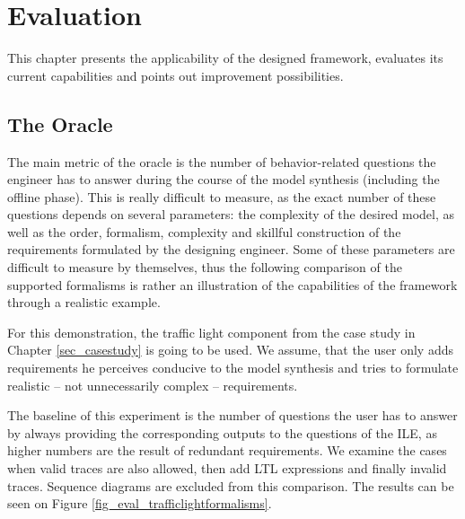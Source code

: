 \chapter{Evaluation}
This chapter presents the applicability of the designed framework, evaluates its current capabilities and points out improvement possibilities.

\section{The Oracle} \label{subs_evaloracle}
The main metric of the oracle is the number of behavior-related questions the engineer has to answer during the course of the model synthesis (including the offline phase). This is really difficult to measure, as the exact number of these questions depends on several parameters: the complexity of the desired model, as well as the order, formalism, complexity and skillful construction of the requirements formulated by the designing engineer. Some of these parameters are difficult to measure by themselves, thus the following comparison of the supported formalisms is rather an illustration of the capabilities of the framework through a realistic example. 

For this demonstration, the traffic light component from the case study in Chapter \ref{sec_casestudy} is going to be used. We assume, that the user only adds requirements he perceives conducive to the model synthesis and tries to formulate realistic -- not unnecessarily complex -- requirements. 

The baseline of this experiment is the number of questions the user has to answer by always providing the corresponding outputs to the questions of the ILE, as higher numbers are the result of redundant requirements. We examine the cases when valid traces are also allowed, then add LTL expressions and finally invalid traces. Sequence diagrams are excluded from this comparison. The results can be seen on Figure \ref{fig_eval_trafficlightformalisms}.

